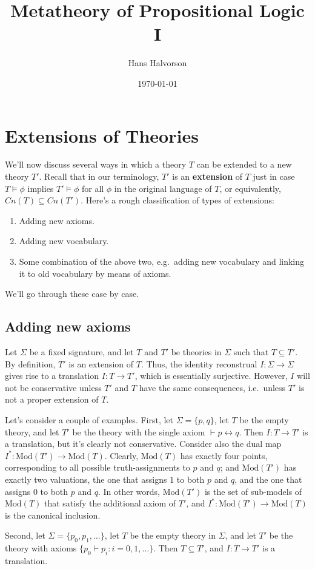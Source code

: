 \documentclass[11pt]{article}
\title{Metatheory of Propositional Logic I}
\author{Hans Halvorson}
\date{\today}
\theoremstyle{definition}
\theoremstyle{remark}
\begin{document}
\section{Extensions of Theories}

We'll now discuss several ways in which a theory $T$ can be extended
to a new theory $T'$.  Recall that in our terminology, $T'$ is an
\textbf{extension} of $T$ just in case $T\vDash \phi$ implies
$T'\vDash \phi$ for all $\phi$ in the original language of $T$, or
equivalently, $Cn(T)\subseteq Cn(T')$.  Here's a rough classification
of types of extensions:
\begin{enumerate}
\item Adding new axioms.
\item Adding new vocabulary. 
\item Some combination of the above two, e.g.\ adding new vocabulary
  and linking it to old vocabulary by means of axioms.
\end{enumerate}
We'll go through these case by case.

\subsection{Adding new axioms}

Let $\Sigma$ be a fixed signature, and let $T$ and $T'$ be theories in
$\Sigma$ such that $T\subseteq T'$.  By definition, $T'$ is an
extension of $T$.  Thus, the identity reconstrual $I:\Sigma\to\Sigma$
gives rise to a translation $I:T\to T'$, which is essentially
surjective. However, $I$ will not be conservative unless $T'$ and $T$
have the same consequences, i.e.\ unless $T'$ is not a proper
extension of $T$.

Let's consider a couple of examples.  First, let $\Sigma = \{ p,q\}$,
let $T$ be the empty theory, and let $T'$ be the theory with the
single axiom $\vdash p\leftrightarrow q$.  Then $I:T\to T'$ is a
translation, but it's clearly not conservative.  Consider also the
dual map $I^*:\mathrm{Mod}(T')\to \mathrm{Mod}(T)$.  Clearly,
$\mathrm{Mod}(T)$ has exactly four points, corresponding to all
possible truth-assignments to $p$ and $q$; and $\mathrm{Mod}(T')$ has
exactly two valuations, the one that assigns $1$ to both $p$ and $q$,
and the one that assigns $0$ to both $p$ and $q$.  In other words,
$\mathrm{Mod}(T')$ is the set of sub-models of $\mathrm{Mod}(T)$ that
satisfy the additional axiom of $T'$, and $I^*:\mathrm{Mod}(T')\to
\mathrm{Mod}(T)$ is the canonical inclusion.

Second, let $\Sigma = \{ p_0,p_1,\dots \}$, let $T$ be the empty
theory in $\Sigma$, and let $T'$ be the theory with axioms $\{
p_0\vdash p_i :i=0,1,\dots \}$.  Then $T\subseteq T'$, and $I:T\to T'$
is a translation.
\end{document}
